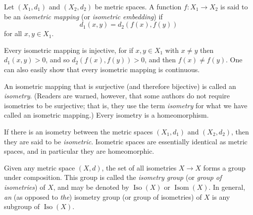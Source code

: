 \documentclass{article}
\def\Iso{\operatorname{Iso}}
\def\Isom{\operatorname{Isom}}
\begin{document}

Let $(X_1,d_1)$ and $(X_2,d_2)$ be metric spaces.
A function $f\colon X_1\to X_2$ is said to be an \emph{isometric mapping}
(or \emph{isometric embedding}) if
\[
  d_1(x,y)=d_2(f(x),f(y))
\]
for all $x,y\in X_1$.

Every isometric mapping is injective,
for if $x,y\in X_1$ with $x\neq y$ then $d_1(x,y)>0$,
and so $d_2(f(x),f(y))>0$, and then $f(x)\neq f(y)$.
One can also easily show that every isometric mapping is continuous.

An isometric mapping that is surjective (and therefore bijective)
is called an \emph{isometry}. 
(Readers are warned, however,
that some authors do not require isometries to be surjective;
that is, they use the term {\it isometry}
for what we have called an isometric mapping.)
Every isometry is a homeomorphism.

If there is an isometry between the metric spaces $(X_1,d_1)$ and $(X_2,d_2)$,
then they are said to be \emph{isometric}.
Isometric spaces are essentially identical as metric spaces,
and in particular they are homeomorphic.

Given any metric space $(X,d)$,
the set of all isometries $X\to X$ forms a group under composition.
This group is called the \emph{isometry group}
(or \emph{group of isometries}) of $X$,
and may be denoted by $\Iso(X)$ or $\Isom(X)$.
In general, {\it an} (as opposed to {\it the}) isometry group 
(or group of isometries) of $X$ is any subgroup of $\Iso(X)$.
\end{document}
